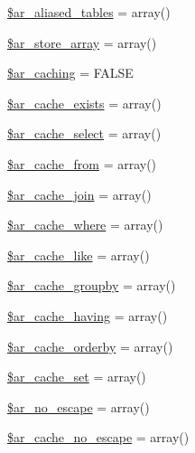 \begin{DoxyCompactItemize}
\hyperlink{class_c_i___d_b__active__record_afc57b21431b4cdf800edd0a18c802e18}{\$ar\-\_\-aliased\-\_\-tables} = array()
\item 
\hyperlink{class_c_i___d_b__active__record_a58c4c18055f541856de85275840aa24c}{\$ar\-\_\-store\-\_\-array} = array()
\item 
\hyperlink{class_c_i___d_b__active__record_a308bcebf4c8adced35e4b38a91d1c786}{\$ar\-\_\-caching} = F\-A\-L\-S\-E
\item 
\hyperlink{class_c_i___d_b__active__record_a18e3446f3dcc9905e3747ef2e7f7b7eb}{\$ar\-\_\-cache\-\_\-exists} = array()
\item 
\hyperlink{class_c_i___d_b__active__record_a5109a1bd9153d54fabc8da05ebabf723}{\$ar\-\_\-cache\-\_\-select} = array()
\item 
\hyperlink{class_c_i___d_b__active__record_a5750eae1b2d422db7838f3647879a0ee}{\$ar\-\_\-cache\-\_\-from} = array()
\item 
\hyperlink{class_c_i___d_b__active__record_a4ba4582934d13ab151701db3f9d0276c}{\$ar\-\_\-cache\-\_\-join} = array()
\item 
\hyperlink{class_c_i___d_b__active__record_a2e79a7f06bc14a5ebb45079623e2e64a}{\$ar\-\_\-cache\-\_\-where} = array()
\item 
\hyperlink{class_c_i___d_b__active__record_a38c187eeb7bcc67cb23daef88a2b12a8}{\$ar\-\_\-cache\-\_\-like} = array()
\item 
\hyperlink{class_c_i___d_b__active__record_a6240f4c779f6c5e4dd0980df51b3adbd}{\$ar\-\_\-cache\-\_\-groupby} = array()
\item 
\hyperlink{class_c_i___d_b__active__record_a7b18f160a87dfb07f85412c549e4c57c}{\$ar\-\_\-cache\-\_\-having} = array()
\item 
\hyperlink{class_c_i___d_b__active__record_ab525cea98bda6b22334981a77a2a9679}{\$ar\-\_\-cache\-\_\-orderby} = array()
\item 
\hyperlink{class_c_i___d_b__active__record_a587ae428156ae056b3f4d88414aa83f4}{\$ar\-\_\-cache\-\_\-set} = array()
\item 
\hyperlink{class_c_i___d_b__active__record_a7c12214d4cda06a8278405a5841fb096}{\$ar\-\_\-no\-\_\-escape} = array()
\item 
\hyperlink{class_c_i___d_b__active__record_afa3320514449f5115b7b25418a94b02e}{\$ar\-\_\-cache\-\_\-no\-\_\-escape} = array()
\end{DoxyCompactItemize}
